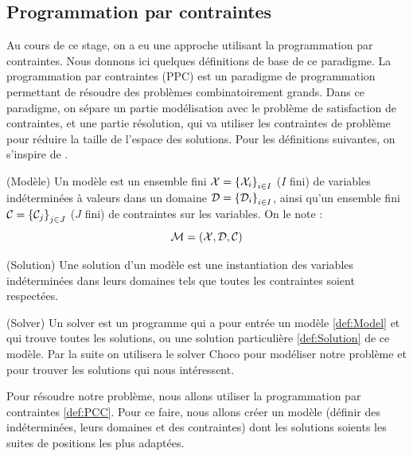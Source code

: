 \subsection{Programmation par contraintes}
\label{subsec:CP}

Au cours de ce stage, on a eu une approche utilisant la programmation par
contraintes. Nous donnons ici quelques définitions de base de ce paradigme.
La programmation par contraintes (PPC) est un paradigme de programmation 
permettant de résoudre des problèmes combinatoirement grands.
Dans ce paradigme, on sépare un partie modélisation avec le problème de
satisfaction de contraintes, et une partie résolution, qui va utiliser les
contraintes de problème pour réduire la taille de l'espace des solutions.
Pour les définitions suivantes, on s'inspire de \cite{introPPC}.

\begin{defi}(Modèle)
  \label{def:Model}
  Un modèle est un ensemble fini $\mathcal{X} = \left\{\mathcal{X}_i\right\}_{i\in{I}}$ ($I$ 
  fini) de variables indéterminées à valeurs dans un domaine 
  $\mathcal{D} = \left\{\mathcal{D}_i\right\}_{i\in I}$, ainsi qu'un ensemble fini 
  $\mathcal{C}  = \left\{\mathcal{C}_j\right\}_{j\in J}$ ($J$ fini) de contraintes sur les 
  variables. On le note :
  $$\mathcal{M} = \left(\mathcal{X}, \mathcal{D}, \mathcal{C}\right)$$
\end{defi}

\begin{defi}(Solution)
  \label{def:Solution}
  Une solution d'un modèle est une instantiation des variables indéterminées
  dans leurs domaines tels que toutes les contraintes soient respectées.
\end{defi}

\begin{defi}(Solver)
  \label{def:Solver}
  Un solver est un programme qui a pour entrée un modèle \ref{def:Model} et qui
  trouve toutes les solutions, ou une solution particulière \ref{def:Solution} 
  de ce modèle.
  Par la suite on utilisera le solver Choco \cite{Choco} pour modéliser notre
  problème et pour trouver les solutions qui nous intéressent.
\end{defi}

Pour résoudre notre problème, nous allons utiliser la programmation par
contraintes \ref{def:PCC}. Pour ce faire, nous allons créer un modèle (définir
des indéterminées, leurs domaines et des contraintes) dont les 
solutions soients les suites de positions les plus adaptées.
\newpage
